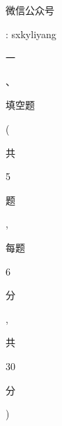 \documentclass[10pt]{article}
\begin{document}
\begin{CJK}{UTF8}{mj}微信公众号\end{CJK}: sxkyliyang

\begin{CJK}{UTF8}{mj}一\end{CJK}、\begin{CJK}{UTF8}{mj}填空题\end{CJK} (\begin{CJK}{UTF8}{mj}共\end{CJK} 5 \begin{CJK}{UTF8}{mj}题\end{CJK}, \begin{CJK}{UTF8}{mj}每题\end{CJK} 6 \begin{CJK}{UTF8}{mj}分\end{CJK}, \begin{CJK}{UTF8}{mj}共\end{CJK} 30 \begin{CJK}{UTF8}{mj}分\end{CJK})
\end{document}
